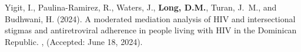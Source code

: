 \begin{thebibliography}{}
Yigit, I., Paulina-Ramirez, R., Waters, J., \textbf{Long, D.M.}, Turan, J.~M., and
  Budhwani, H. (2024).
\newblock A moderated mediation analysis of {HIV} and intersectional stigmas
  and antiretroviral adherence in people living with {HIV} in the {Dominican}
  {Republic}.
, (Accepted: June 18, 2024).




\end{thebibliography}
